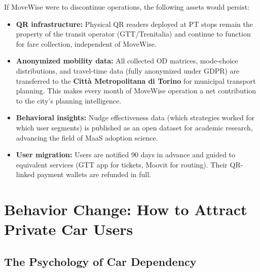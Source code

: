 \documentclass[11pt,a4paper]{article}
\begin{document}
If MoveWise were to discontinue operations, the following assets would persist:
\begin{itemize}[noitemsep]
    \item \textbf{QR infrastructure:} Physical QR readers deployed at PT stops remain the property of the transit operator (GTT/Trenitalia) and continue to function for fare collection, independent of MoveWise.
    \item \textbf{Anonymized mobility data:} All collected OD matrices, mode-choice distributions, and travel-time data (fully anonymized under GDPR) are transferred to the \textbf{Citt\`a Metropolitana di Torino} for municipal transport planning. This makes every month of MoveWise operation a net contribution to the city's planning intelligence.
    \item \textbf{Behavioral insights:} Nudge effectiveness data (which strategies worked for which user segments) is published as an open dataset for academic research, advancing the field of MaaS adoption science.
    \item \textbf{User migration:} Users are notified 90 days in advance and guided to equivalent services (GTT app for tickets, Moovit for routing). Their QR-linked payment wallets are refunded in full.
\end{itemize}

\section{Behavior Change: How to Attract Private Car Users}
\label{sec:nudge}

\subsection{The Psychology of Car Dependency}
\end{document}
